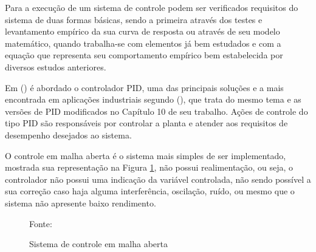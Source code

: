 Para a execução de um sistema de controle podem ser verificados requisitos do sistema de duas formas básicas, sendo a primeira através dos testes e levantamento empírico da sua curva de resposta ou através de seu modelo matemático, quando trabalha-se com elementos já bem estudados e com a equação que representa seu comportamento empírico bem estabelecida por diversos estudos anteriores.


Em \citeauthor{dorf2011modern}(\citeyear{dorf2011modern}) 
é abordado o controlador PID, uma das principais soluções e a mais encontrada em aplicações industriais segundo \citeauthor{Ogata}(\citeyear{Ogata}), que trata do mesmo tema e as versões de PID modificados no Capítulo 10 de seu trabalho. 
Ações de controle do tipo PID são responsáveis por controlar a planta e atender aos requisitos de desempenho desejados ao sistema.






O controle em malha aberta é o sistema mais simples de ser
implementado, mostrada sua representação na Figura \ref{fig:AnexoAAcaoMalhaAberta}, não possui realimentação, ou seja, o controlador não possui uma indicação da variável controlada, não sendo possível a sua correção caso haja alguma interferência, oscilação, ruído, ou mesmo que o sistema não apresente baixo rendimento.

\begin{figure}[!htb]
\centering
\caption{ Sistema de controle em malha aberta}
\label{fig:AnexoAAcaoMalhaAberta}

{\small Fonte: \cite{Ogata}}
\end{figure}

